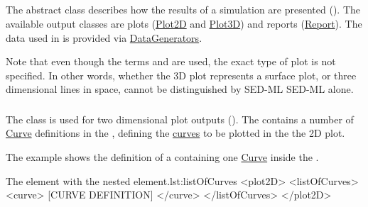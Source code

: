 \subsection{}
\label{class:output}

The abstract  class describes how the results of a simulation are presented (). The available output classes are plots (\hyperref[class:plot2D]{Plot2D} and \hyperref[class:plot3D]{Plot3D}) and reports (\hyperref[class:report]{Report}). The data used in  is provided via \hyperref[class:dataGenerator]{DataGenerators}.







Note that even though the terms  and  are used, the exact type of plot is not specified. In other words, whether the 3D plot represents a surface plot, or three dimensional lines in space, cannot be distinguished by SED-ML SED-ML \currentLV alone.


\subsubsection{}
\label{class:plot2D}
The  class is used for two dimensional plot outputs (). The  contains a number of \hyperref[class:curve]{Curve} definitions in the , defining the \hyperref[class:curve]{curves} to be plotted in the the 2D plot.

The example shows the definition of a  containing one \hyperref[class:curve]{Curve} inside the .
\begin{myXmlLst}{The  element with the nested  element.}{lst:listOfCurves}
<plot2D>
	<listOfCurves>
		<curve>
			[CURVE DEFINITION]
		</curve>
	</listOfCurves>
</plot2D>
\end{myXmlLst}



